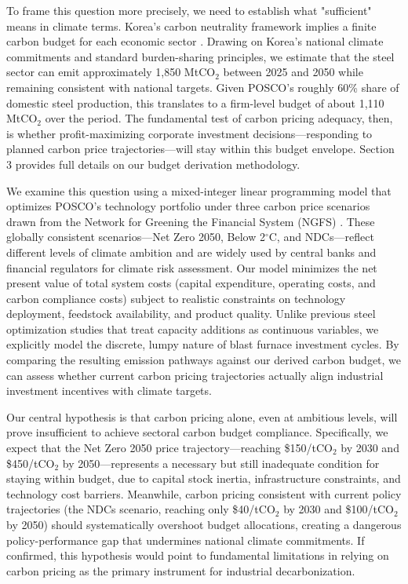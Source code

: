 \documentclass[preprint,1p,authoryear]{elsarticle}
\begin{document}
To frame this question more precisely, we need to establish what "sufficient" means in climate terms. Korea's carbon neutrality framework implies a finite carbon budget for each economic sector \citep{korea2020carbon}. Drawing on Korea's national climate commitments and standard burden-sharing principles, we estimate that the steel sector can emit approximately 1,850 MtCO$_2$ between 2025 and 2050 while remaining consistent with national targets. Given POSCO's roughly 60\% share of domestic steel production, this translates to a firm-level budget of about 1,110 MtCO$_2$ over the period. The fundamental test of carbon pricing adequacy, then, is whether profit-maximizing corporate investment decisions—responding to planned carbon price trajectories—will stay within this budget envelope. Section 3 provides full details on our budget derivation methodology.

We examine this question using a mixed-integer linear programming model that optimizes POSCO's technology portfolio under three carbon price scenarios drawn from the Network for Greening the Financial System (NGFS) \citep{NGFS2024}. These globally consistent scenarios—Net Zero 2050, Below 2$^\circ$C, and NDCs—reflect different levels of climate ambition and are widely used by central banks and financial regulators for climate risk assessment. Our model minimizes the net present value of total system costs (capital expenditure, operating costs, and carbon compliance costs) subject to realistic constraints on technology deployment, feedstock availability, and product quality. Unlike previous steel optimization studies that treat capacity additions as continuous variables, we explicitly model the discrete, lumpy nature of blast furnace investment cycles. By comparing the resulting emission pathways against our derived carbon budget, we can assess whether current carbon pricing trajectories actually align industrial investment incentives with climate targets.

Our central hypothesis is that carbon pricing alone, even at ambitious levels, will prove insufficient to achieve sectoral carbon budget compliance. Specifically, we expect that the Net Zero 2050 price trajectory—reaching \$150/tCO$_2$ by 2030 and \$450/tCO$_2$ by 2050—represents a necessary but still inadequate condition for staying within budget, due to capital stock inertia, infrastructure constraints, and technology cost barriers. Meanwhile, carbon pricing consistent with current policy trajectories (the NDCs scenario, reaching only \$40/tCO$_2$ by 2030 and \$100/tCO$_2$ by 2050) should systematically overshoot budget allocations, creating a dangerous policy-performance gap that undermines national climate commitments. If confirmed, this hypothesis would point to fundamental limitations in relying on carbon pricing as the primary instrument for industrial decarbonization.
\end{document}

